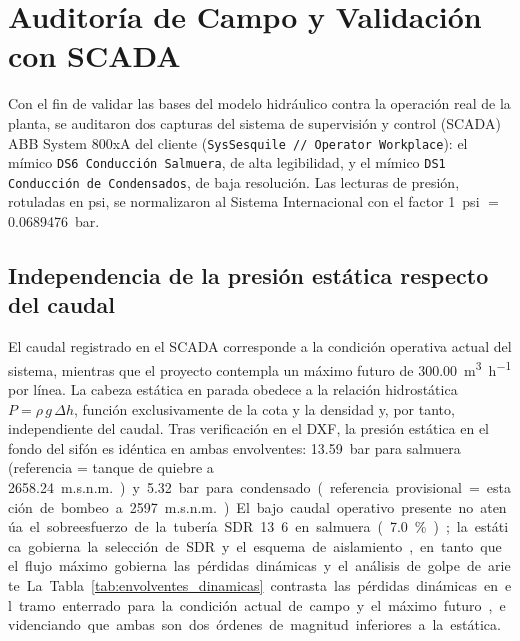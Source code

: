 \section{Auditoría de Campo y Validación con SCADA}
\label{sec:auditoria}

Con el fin de validar las bases del modelo hidráulico contra la operación real de la planta, se auditaron dos capturas del sistema de supervisión y control (SCADA) ABB System 800xA del cliente (\texttt{SysSesquile // Operator Workplace}): el mímico \texttt{DS6 Conducción Salmuera}, de alta legibilidad, y el mímico \texttt{DS1 Conducción de Condensados}, de baja resolución. Las lecturas de presión, rotuladas en psi, se normalizaron al Sistema Internacional con el factor \num{1}~psi $=$ \SI{0.0689476}{bar}.

\subsection{Independencia de la presión estática respecto del caudal}
\label{ssec:auditoria_flujo}

El caudal registrado en el SCADA corresponde a la condición operativa actual del sistema, mientras que el proyecto contempla un máximo futuro de \SI{300.00}{\cubic\meter\per\hour} por línea. La cabeza estática en parada obedece a la relación hidrostática $P = \rho\,g\,\Delta h$, función exclusivamente de la cota y la densidad y, por tanto, independiente del caudal. Tras verificación en el DXF, la presión estática en el fondo del sifón es idéntica en ambas envolventes: \SI{13.59}{bar} para salmuera (referencia = tanque de quiebre a \SI{2658.24}{m.s.n.m.}) y \SI{5.32}{bar} para condensado (referencia provisional = estación de bombeo a \SI{2597}{m.s.n.m.}). El bajo caudal operativo presente no atenúa el sobreesfuerzo de la tubería SDR 13.6 en salmuera (\SI{+7.0}{\percent}); la estática gobierna la selección de SDR y el esquema de aislamiento, en tanto que el flujo máximo gobierna las pérdidas dinámicas y el análisis de golpe de ariete.

La Tabla~\ref{tab:envolventes_dinamicas} contrasta las pérdidas dinámicas en el tramo enterrado para la condición actual de campo y el máximo futuro, evidenciando que ambas son dos órdenes de magnitud inferiores a la estática.

